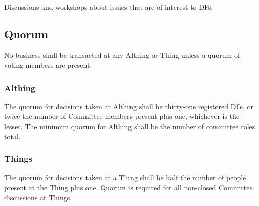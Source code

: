\documentclass[a4paper, 11pt]{report}
\begin{document}
\paragraph{}
Discussions and workshops about issues that are of interest to DFs. 

\subsection{Quorum}
\label{sec:quorum}
No business shall be transacted at any Althing or Thing unless a quorum of voting
members are present.
\subsubsection{Althing} The quorum for decisions taken at Althing shall be thirty-one registered DFs, or twice the number of Committee members present plus one, whichever is the lesser. The minimum quorum for Althing shall be the number of committee roles total.
\subsubsection{Things} The quorum for decisions taken at a Thing shall be half the number of people present at the Thing plus one. Quorum is required for all non-closed Committee discussions at Things.
\end{document}
